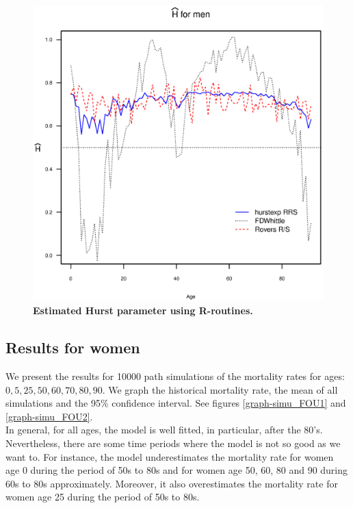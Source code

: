 \documentclass[smallextended]{svjour3}
\begin{document}
\begin{figure}[H]
    \includegraphics[scale=0.7, keepaspectratio]{Hurst-Men.eps}
    \caption{\bf Estimated Hurst parameter using R-routines.}
    \label{graph-Hurst_Est_Me}
\end{figure}\vspace*{0.1cm}




\subsection{Results for women}\label{re-wom}

We present the results for 10000 path simulations of the mortality rates for ages:
$0,5,25,50,60,70,80,90$.
We graph the historical mortality rate, the mean of all simulations and the
95\% confidence interval. See figures \ref{graph-simu_FOU1} and
\ref{graph-simu_FOU2}.\\

In general, for all ages, the model is well fitted, in particular, after the
80's. Nevertheless, there are some time periods where the model is not
so good as we want to. For instance, the model underestimates the mortality
rate for women age 0 during the period of 50s to 80s and for women age 50, 60,
80 and 90 during
60s to 80s approximately. Moreover, it also overestimates the mortality rate for
women age 25 during the period of 50s to 80s.
\end{document}
